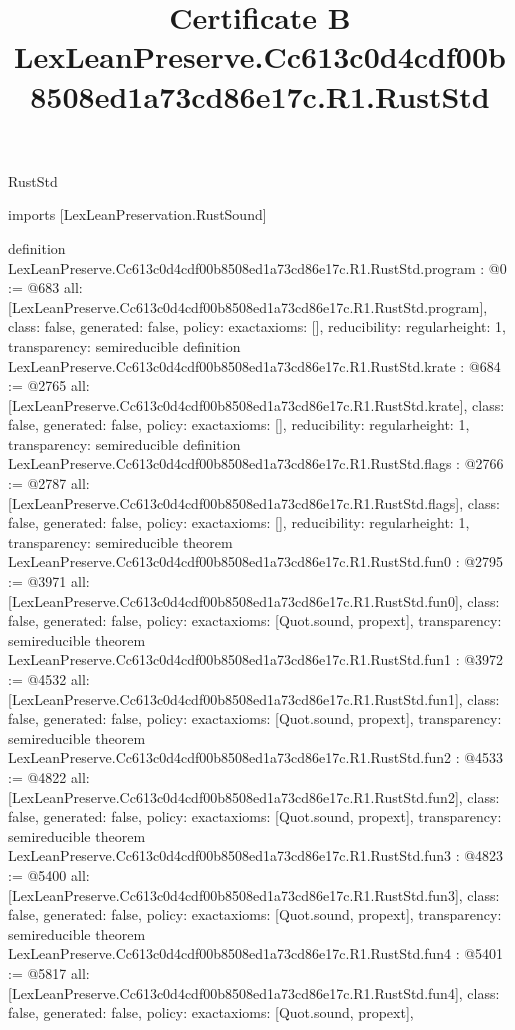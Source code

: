 \begin{lexlean}{RustStd}
\title{Certificate B LexLeanPreserve.Cc613c0d4cdf00b8508ed1a73cd86e17c.R1.RustStd}
\begin{coremodule}
imports [LexLeanPreservation.RustSound]

definition LexLeanPreserve.Cc613c0d4cdf00b8508ed1a73cd86e17c.R1.RustStd.program : @0 := @683 {
  all: [LexLeanPreserve.Cc613c0d4cdf00b8508ed1a73cd86e17c.R1.RustStd.program],
  class: false,
  generated: false,
  policy: exact{axioms: []},
  reducibility: regular{height: 1},
  transparency: semireducible
}
definition LexLeanPreserve.Cc613c0d4cdf00b8508ed1a73cd86e17c.R1.RustStd.krate : @684 := @2765 {
  all: [LexLeanPreserve.Cc613c0d4cdf00b8508ed1a73cd86e17c.R1.RustStd.krate],
  class: false,
  generated: false,
  policy: exact{axioms: []},
  reducibility: regular{height: 1},
  transparency: semireducible
}
definition LexLeanPreserve.Cc613c0d4cdf00b8508ed1a73cd86e17c.R1.RustStd.flags : @2766 := @2787 {
  all: [LexLeanPreserve.Cc613c0d4cdf00b8508ed1a73cd86e17c.R1.RustStd.flags],
  class: false,
  generated: false,
  policy: exact{axioms: []},
  reducibility: regular{height: 1},
  transparency: semireducible
}
theorem LexLeanPreserve.Cc613c0d4cdf00b8508ed1a73cd86e17c.R1.RustStd.fun0 : @2795 := @3971 {
  all: [LexLeanPreserve.Cc613c0d4cdf00b8508ed1a73cd86e17c.R1.RustStd.fun0],
  class: false,
  generated: false,
  policy: exact{axioms: [Quot.sound, propext]},
  transparency: semireducible
}
theorem LexLeanPreserve.Cc613c0d4cdf00b8508ed1a73cd86e17c.R1.RustStd.fun1 : @3972 := @4532 {
  all: [LexLeanPreserve.Cc613c0d4cdf00b8508ed1a73cd86e17c.R1.RustStd.fun1],
  class: false,
  generated: false,
  policy: exact{axioms: [Quot.sound, propext]},
  transparency: semireducible
}
theorem LexLeanPreserve.Cc613c0d4cdf00b8508ed1a73cd86e17c.R1.RustStd.fun2 : @4533 := @4822 {
  all: [LexLeanPreserve.Cc613c0d4cdf00b8508ed1a73cd86e17c.R1.RustStd.fun2],
  class: false,
  generated: false,
  policy: exact{axioms: [Quot.sound, propext]},
  transparency: semireducible
}
theorem LexLeanPreserve.Cc613c0d4cdf00b8508ed1a73cd86e17c.R1.RustStd.fun3 : @4823 := @5400 {
  all: [LexLeanPreserve.Cc613c0d4cdf00b8508ed1a73cd86e17c.R1.RustStd.fun3],
  class: false,
  generated: false,
  policy: exact{axioms: [Quot.sound, propext]},
  transparency: semireducible
}
theorem LexLeanPreserve.Cc613c0d4cdf00b8508ed1a73cd86e17c.R1.RustStd.fun4 : @5401 := @5817 {
  all: [LexLeanPreserve.Cc613c0d4cdf00b8508ed1a73cd86e17c.R1.RustStd.fun4],
  class: false,
  generated: false,
  policy: exact{axioms: [Quot.sound, propext]},
}
\end{coremodule}
\end{lexlean}
